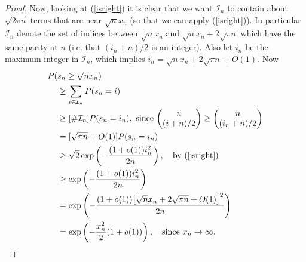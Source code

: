 \begin{proof}
Now, looking at (\ref{isright}) it is clear that we want $\mathcal I_n$ to contain about $\sqrt{2\pi n}$ terms that are near $\sqrt{n} x_n$ (so that we can apply  (\ref{isright})). In particular $\mathcal I_n$ denote the set of indices between $\sqrt{n}x_n$ and $\sqrt{n}x_n + 2\sqrt{\pi n}$ which have the same parity at $n$ (i.e. that $(i_n + n)/2$ is an integer).  Also let $i_n$ be the maximum integer in $\mathcal I_n$, which implies $i_n = \sqrt{n}x_n + 2\sqrt{\pi n} + O(1)$. Now
\begin{align*}
P(&s_n\geq \sqrt{n} x_n)\\
&\geq \sum_{i\in\mathcal I_n} P(s_n = i)\\
&\geq [\# \mathcal I_n] P(s_n = i_n),\,\,\text{since $\begin{pmatrix} n \\ (i +n)/2 \end{pmatrix}\geq \begin{pmatrix} n \\ (i_n +n)/2 \end{pmatrix}$}\\
&= [\sqrt{\pi n}+ O(1)] P(s_n = i_n)\\
&\geq \sqrt{2}\exp\left( - \frac{(1+o(1)) i_n^2}{2n} \right),\quad\text{by (\ref{isright})}\\
&\geq \exp\left( - \frac{(1+o(1)) i_n^2}{2n} \right) \\
&= \exp\left( - \frac{(1+o(1))\bigl[\sqrt{n}x_n +2\sqrt{\pi n} + O(1) \bigr]^2}{2n}  \right) \\
&= \exp\left( - \frac{x_n^2}{2} (1+o(1)) \right),\quad\text{since $x_n\rightarrow \infty$}.
\end{align*}


\end{proof}
